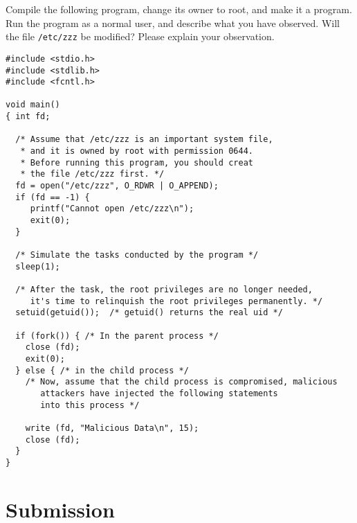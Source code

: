 Compile the following program, change its owner to root, and
make it a \setuid program. Run the program as a normal user,
and describe what you have observed.
Will the file {\tt /etc/zzz} be modified? Please explain
your observation.

\begin{lstlisting}
#include <stdio.h>
#include <stdlib.h>
#include <fcntl.h>

void main()
{ int fd;

  /* Assume that /etc/zzz is an important system file,
   * and it is owned by root with permission 0644.
   * Before running this program, you should creat
   * the file /etc/zzz first. */
  fd = open("/etc/zzz", O_RDWR | O_APPEND);
  if (fd == -1) {
     printf("Cannot open /etc/zzz\n");
     exit(0);
  }

  /* Simulate the tasks conducted by the program */
  sleep(1);

  /* After the task, the root privileges are no longer needed,
     it's time to relinquish the root privileges permanently. */
  setuid(getuid());  /* getuid() returns the real uid */

  if (fork()) { /* In the parent process */
    close (fd);
    exit(0);
  } else { /* in the child process */
    /* Now, assume that the child process is compromised, malicious
       attackers have injected the following statements
       into this process */

    write (fd, "Malicious Data\n", 15);
    close (fd);
  }
}
\end{lstlisting}




\section{Submission}






